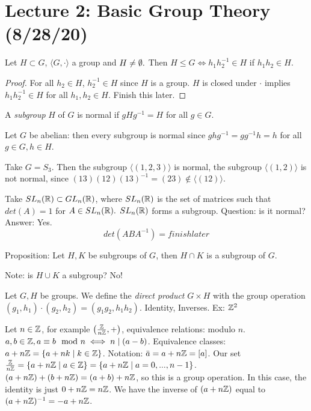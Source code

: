 \section{Lecture 2: Basic Group Theory (8/28/20)}
\begin{lemma} Let $H \subset G$, $\langle G, \cdot \rangle$ a group and $H \neq \emptyset.$ Then $H \leq G \iff h_1h_2^{-1}\in H$ if $h_1h_2 \in H.$
\end{lemma}
\begin{proof}
    For all $h_2 \in H$, $h_2^{-1} \in H$ since $H$ is a group. $H$ is closed under $\cdot$ implies $h_1h_2^{-1}\in H$ for all $h_1,h_2 \in H$. Finish this later.
\end{proof}

\begin{definition}[Subgroup]
    A \emph{subgroup} $H$ of $G$ is normal if $gHg^{-1}=H$ for all $g \in G$.
\end{definition}
\begin{example}
    Let $G$ be abelian: then every subgroup is normal since $ghg^{-1}=gg^{-1}h=h$ for all $g \in G, h \in H$.
\end{example}
\begin{example}
    Take $G=S_3.$ Then the subgroup $\langle (1,2,3) \rangle$ is normal, the subgroup $\langle (1,2) \rangle$ is not normal, since $(13)(12)(13)^{-1}=(23) \notin \langle(12)\rangle$.
\end{example}
\begin{example}
    Take $SL_n(\mathbb{R}) \subset GL_n(\mathbb{R})$, where $SL_n(\mathbb{R})$ is the set of matrices such that $det(A)=1$ for $A \in SL_n(\mathbb{R}).$ $SL_n(\mathbb{R})$ forms a subgroup. Question: is it normal? Answer: Yes. 
    \[
        det(ABA^{-1})=finish later
    \]
\end{example}

Proposition: Let $H, K$ be subgroups of $G$, then $H \cap K$ is a subgroup of $G.$

Note: is $H \cup K$ a subgroup? No!

\begin{definition}
    Let $G,H$ be groups. We define the \emph{direct product} $G \times H$ with the group operation $(g_1,h_1)\cdot(g_2,h_2)=(g_1g_2,h_1h_2)$. Identity, Inverses. Ex: $\mathbb{Z}^2$
\end{definition}

\begin{example}
    Let $n \in \mathbb{Z}$, for example $\left( \frac{\mathbb{Z}}{n\mathbb{Z}}, + \right) $, equivalence relations: modulo $n$. $a,b \in \mathbb{Z}, a \equiv b \mod n \iff n \mid (a-b)$. Equivalence classes: $a+n\mathbb{Z} = \{ a+nk \mid k \in \mathbb{Z} \}$. Notation: $\bar{a}=a+n\mathbb{Z}=[a]$. Our set $\frac{\mathbb{Z}}{n\mathbb{Z}}=\{a+n\mathbb{Z} \mid a \in \mathbb{Z} \} = \{ a + n\mathbb{Z} \mid a=0, ... , n-1 \}$. $(a+n\mathbb{Z})+(b+n\mathbb{Z})=(a+b)+n\mathbb{Z}$, so this is a group operation. In this case, the identity is just $0+n\mathbb{Z}=n\mathbb{Z}$. We have the inverse of $(a+n\mathbb{Z})$ equal to $(a+n\mathbb{Z})^{-1}=-a+n\mathbb{Z}$.
\end{example}

